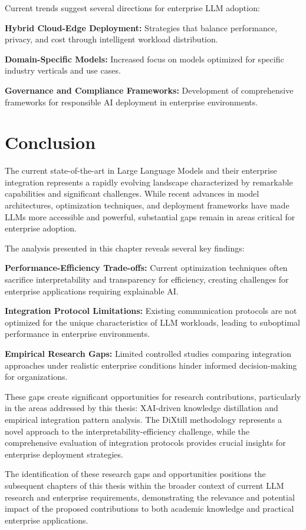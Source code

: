Current trends suggest several directions for enterprise LLM adoption:

\textbf{Hybrid Cloud-Edge Deployment:} Strategies that balance performance, privacy, and cost through intelligent workload distribution.

\textbf{Domain-Specific Models:} Increased focus on models optimized for specific industry verticals and use cases.

\textbf{Governance and Compliance Frameworks:} Development of comprehensive frameworks for responsible AI deployment in enterprise environments.

\section{Conclusion}

The current state-of-the-art in Large Language Models and their enterprise integration represents a rapidly evolving landscape characterized by remarkable capabilities and significant challenges. While recent advances in model architectures, optimization techniques, and deployment frameworks have made LLMs more accessible and powerful, substantial gaps remain in areas critical for enterprise adoption.

The analysis presented in this chapter reveals several key findings:

\textbf{Performance-Efficiency Trade-offs:} Current optimization techniques often sacrifice interpretability and transparency for efficiency, creating challenges for enterprise applications requiring explainable AI.

\textbf{Integration Protocol Limitations:} Existing communication protocols are not optimized for the unique characteristics of LLM workloads, leading to suboptimal performance in enterprise environments.

\textbf{Empirical Research Gaps:} Limited controlled studies comparing integration approaches under realistic enterprise conditions hinder informed decision-making for organizations.

These gaps create significant opportunities for research contributions, particularly in the areas addressed by this thesis: XAI-driven knowledge distillation and empirical integration pattern analysis. The DiXtill methodology represents a novel approach to the interpretability-efficiency challenge, while the comprehensive evaluation of integration protocols provides crucial insights for enterprise deployment strategies.

The identification of these research gaps and opportunities positions the subsequent chapters of this thesis within the broader context of current LLM research and enterprise requirements, demonstrating the relevance and potential impact of the proposed contributions to both academic knowledge and practical enterprise applications.